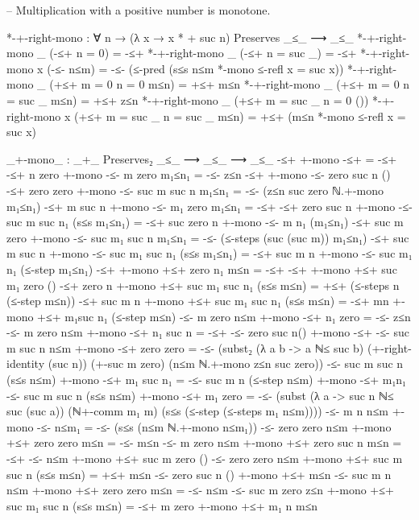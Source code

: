 \documentclass[11pt,a4paper]{article}
\begin{document}
\begin{code}
-- Multiplication with a positive number is monotone.

*-+-right-mono : ∀ n → (λ x → x * + suc n) Preserves _≤_ ⟶ _≤_
*-+-right-mono _ (-≤+             {n = 0})         = -≤+
*-+-right-mono _ (-≤+             {n = suc _})     = -≤+
*-+-right-mono x (-≤-                         n≤m) =
  -≤- (≤-pred (s≤s n≤m *-mono ≤-refl {x = suc x}))
*-+-right-mono _ (+≤+ {m = 0}     {n = 0}     m≤n) = +≤+ m≤n
*-+-right-mono _ (+≤+ {m = 0}     {n = suc _} m≤n) = +≤+ z≤n
*-+-right-mono _ (+≤+ {m = suc _} {n = 0}     ())
*-+-right-mono x (+≤+ {m = suc _} {n = suc _} m≤n) =
  +≤+ (m≤n *-mono ≤-refl {x = suc x})

_+-mono_ :  _+_ Preserves₂ _≤_ ⟶ _≤_ ⟶ _≤_
-≤+ +-mono -≤+ = -≤+
-≤+ {n} {zero} +-mono -≤- {m} {zero} m₁≤n₁ = -≤- z≤n
-≤+ +-mono -≤- {zero} {suc n} ()
-≤+ {zero} {zero} +-mono -≤- {suc m} {suc n} m₁≤n₁ =
  -≤- (z≤n {suc zero} ℕ.+-mono m₁≤n₁)
-≤+ {m} {suc n} +-mono -≤- {m₁} {zero} m₁≤n₁ = -≤+
-≤+ {zero} {suc n} +-mono -≤- {suc m} {suc n₁} (s≤s m₁≤n₁) =
  -≤+ {suc zero} {n} +-mono -≤- {m} {n₁} (m₁≤n₁)
-≤+ {suc m} {zero} +-mono -≤- {suc m₁} {suc n} m₁≤n₁ =
  -≤- (≤-steps (suc (suc m)) m₁≤n₁)
-≤+ {suc m} {suc n} +-mono -≤- {suc m₁} {suc n₁} (s≤s m₁≤n₁) =
  -≤+ {suc m} {n} +-mono -≤- {suc m₁} {n₁} (≤-step m₁≤n₁)
-≤+ +-mono +≤+ {zero} {n₁} m≤n = -≤+
-≤+ +-mono +≤+ {suc m₁} {zero} () 
-≤+ {zero} {n} +-mono +≤+ {suc m₁} {suc n₁} (s≤s m≤n) =
  +≤+ (≤-steps n (≤-step m≤n))
-≤+ {suc m} {n} +-mono +≤+ {suc m₁} {suc n₁} (s≤s m≤n) =
  -≤+ {m}{n} +-mono +≤+ {m₁}{suc n₁} (≤-step m≤n)
-≤- {m} {zero} n≤m +-mono -≤+ {n₁} {zero} = -≤- z≤n
-≤- {m} {zero} n≤m +-mono -≤+ {n₁} {suc n} = -≤+
-≤- {zero} {suc n}() +-mono -≤+
-≤- {suc m} {suc n} n≤m +-mono -≤+ {zero} {zero} =
  -≤- (subst₂ (λ a b -> a ℕ≤ suc b) (+-right-identity (suc n))
    (+-suc m zero) (n≤m ℕ.+-mono z≤n {suc zero}))
-≤- {suc m} {suc n} (s≤s n≤m) +-mono -≤+ {m₁} {suc n₁} =
  -≤- {suc m} {n} (≤-step n≤m) +-mono -≤+ {m₁}{n₁}
-≤- {suc m} {suc n} (s≤s n≤m) +-mono -≤+ {m₁} {zero} =
  -≤- (subst (λ a -> suc n ℕ≤ suc (suc a)) (ℕ+-comm m₁ m)
    (s≤s (≤-step (≤-steps m₁ n≤m))))
-≤- {m} {n}  n≤m +-mono -≤-  n≤m₁ = -≤- (s≤s (n≤m ℕ.+-mono n≤m₁))
-≤- {zero} {zero} n≤m +-mono +≤+ {zero} {zero} m≤n = -≤- m≤n
-≤- {m} {zero} n≤m +-mono +≤+ {zero} {suc n} m≤n = -≤+
-≤-  n≤m +-mono +≤+ {suc m} {zero} ()
-≤- {zero} {zero} n≤m +-mono +≤+ {suc m} {suc n} (s≤s m≤n) =
  +≤+ m≤n
-≤- {zero} {suc n} () +-mono +≤+ m≤n
-≤- {suc m} {n} n≤m +-mono +≤+ {zero} {zero} m≤n = -≤- n≤m
-≤- {suc m} {zero} z≤n +-mono +≤+ {suc m₁} {suc n} (s≤s m≤n) =
  -≤+ {m} {zero} +-mono +≤+ {m₁} {n} m≤n

\end{code}
\end{document}
